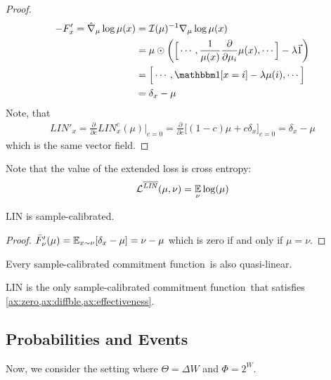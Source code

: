 \documentclass{article}
\def\cofunc{commitment function}
\begin{document}
\begin{proof}
    \begin{align*}
    - F'_x = \hat \nabla_{\mu} \log \mu(x) &=  
        \mathcal I(\mu)^{-1} \nabla_\mu \log \mu(x) \\
        &= \mu \odot \left(\Big[ \cdots, \frac1{\mu(x)}\frac{\partial}{\partial \mu_i} \mu(x), \cdots \Big] - \lambda \vec 1 \right) \\
        &= \Big[\cdots, \mathbbm1[x=i] - \lambda \mu(i) ,\cdots\Big] \\
        &= \delta_x - \mu            
    \end{align*}
    Note, that
    \begin{align*}
        \mathit{LIN}'_x = \frac{\partial}{\partial c} \mathit{LIN}^c_x(\mu) \Big|_{c=0} 
            = \frac{\partial}{\partial c} \Big[ (1-c) \mu + c \delta_x \Big]_{c=0} = \delta_x - \mu
    \end{align*}
    which is the same vector field.  
\end{proof}

Note that the value of the extended loss is cross entropy:
\begin{align*}
    \mathcal L^{\overline{\mathit{LIN}}}(\mu, \nu) = \operatorname*{\mathbb{E}}_{\nu} \log(\mu)
\end{align*}

\begin{prop}
    LIN is sample-calibrated.
\end{prop}
\begin{proof}
    $ \bar F'_\nu(\mu) = \operatorname*{\mathbb{E}}_{x \sim \nu}[ \delta_x - \mu ] = \nu - \mu$ 
    which is zero if and only if $\mu = \nu$.
\end{proof}


\begin{conj}
    Every sample-calibrated \cofunc\  is also quasi-linear. 
\end{conj}
\begin{conj}
    LIN is the only sample-calibrated \cofunc\ that satisfies
    \cref{ax:zero,ax:diffble,ax:effectiveness}.
\end{conj}

\subsection{Probabilities and Events}
Now, we consider the setting where $\Theta = \Delta W$ and $\Phi = 2^W$. 
\end{document}
